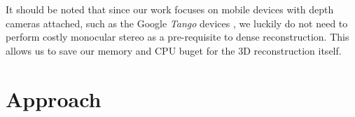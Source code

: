 It should be noted that since our work focuses on mobile devices with depth
cameras attached, such as the Google \emph{Tango} devices \cite{Tango}, we
luckily do not need to perform costly monocular stereo as a pre-requisite to
dense reconstruction. This allows us to save our memory and CPU buget for the
3D reconstruction itself.

\section{Approach} 
